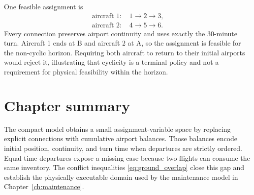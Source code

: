 One feasible assignment is
\begin{align*}
    \text{aircraft 1: }&1\rightarrow2\rightarrow3,\\
    \text{aircraft 2: }&4\rightarrow5\rightarrow6.
\end{align*}
Every connection preserves airport continuity and uses exactly the 30-minute
turn. Aircraft 1 ends at B and aircraft 2 at A, so the assignment is feasible
for the non-cyclic horizon. Requiring both aircraft to return to their initial
airports would reject it, illustrating that cyclicity is a terminal policy and
not a requirement for physical feasibility within the horizon.

\section{Chapter summary}

The compact model obtains a small assignment-variable space by replacing
explicit connections with cumulative airport balances. Those balances encode
initial position, continuity, and turn time when departures are strictly
ordered. Equal-time departures expose a missing case because two flights can
consume the same inventory. The conflict inequalities
\eqref{eq:ground_overlap} close this gap and establish the physically executable
domain used by the maintenance model in Chapter~\ref{ch:maintenance}.
